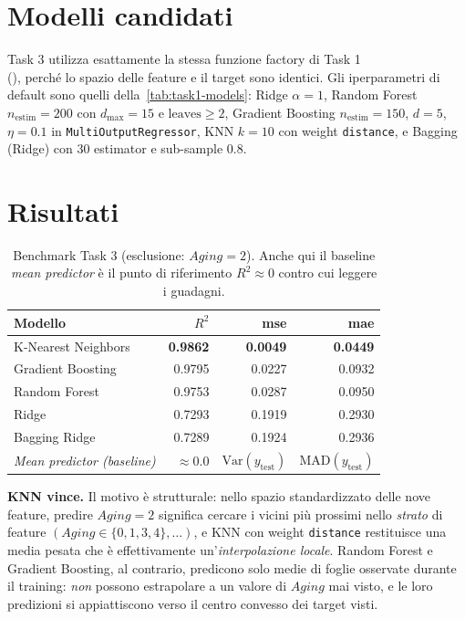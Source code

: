 \section{Modelli candidati}

Task 3 utilizza esattamente la stessa funzione factory di Task 1 \\
(), perché lo
spazio delle feature e il target sono identici. Gli iperparametri di
default sono quelli della~\cref{tab:task1-models}: Ridge $\alpha=1$,
Random Forest $n_\text{estim}=200$ con $d_\text{max}=15$ e
$\text{leaves} \geq 2$, Gradient Boosting $n_\text{estim}=150$, $d=5$,
$\eta=0.1$ in \texttt{MultiOutputRegressor}, KNN $k=10$ con weight
\texttt{distance}, e Bagging (Ridge) con 30 estimator e sub-sample
$0.8$.

\section{Risultati}

\begin{table}[H]
  \centering
  \caption{Benchmark Task 3 (esclusione: $Aging = 2$). Anche qui il
  baseline \emph{mean predictor} è il punto di riferimento $R^{2}\!\approx\!0$
  contro cui leggere i guadagni.}
  \label{tab:task3-benchmark}
  \begin{tabular}{lrrr}
    \toprule
    \textbf{Modello} & $R^{2}$ & \acrshort{mse} & \acrshort{mae} \\
    \midrule
    K-Nearest Neighbors & \textbf{0.9862} & \textbf{0.0049} & \textbf{0.0449} \\
    Gradient Boosting   & 0.9795 & 0.0227 & 0.0932 \\
    Random Forest       & 0.9753 & 0.0287 & 0.0950 \\
    Ridge               & 0.7293 & 0.1919 & 0.2930 \\
    Bagging Ridge       & 0.7289 & 0.1924 & 0.2936 \\
    \midrule
    \emph{Mean predictor (baseline)} & $\approx 0.0$ & $\mathrm{Var}(y_\text{test})$ & $\mathrm{MAD}(y_\text{test})$ \\
    \bottomrule
  \end{tabular}
\end{table}

\textbf{KNN vince.} Il motivo è strutturale: nello spazio standardizzato
delle nove feature, predire $Aging = 2$ significa cercare i vicini più
prossimi nello \emph{strato} di feature
$(Aging \in \{0, 1, 3, 4\}, \dots)$, e KNN con weight \texttt{distance}
restituisce una media pesata che è effettivamente un'\emph{interpolazione
locale}. Random Forest e Gradient Boosting, al contrario, predicono solo
medie di foglie osservate durante il training: \emph{non} possono
estrapolare a un valore di $Aging$ mai visto, e le loro predizioni si
appiattiscono verso il centro convesso dei target visti.

